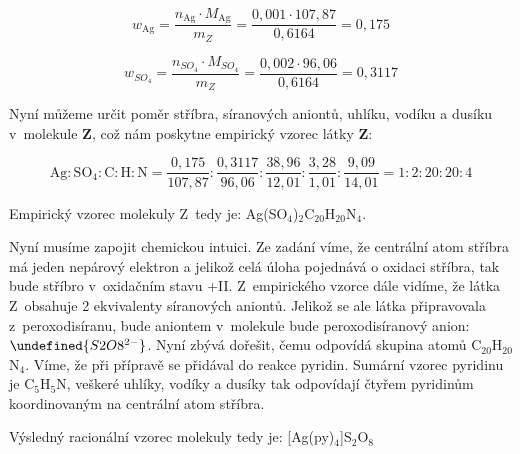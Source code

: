 \documentclass{book}
\let\ch\undefined
\begin{document}
\[
w_{\mathrm{Ag}}=\frac{n_{\mathrm{Ag}}\cdot M_{\mathrm{Ag}}}{m_{Z}}=\frac{0,001\cdot107,87}{0,6164}=0,175
\]

\[
w_{SO_{4}}=\frac{n_{SO_{4}}\cdot M_{SO_{4}}}{m_{Z}}=\frac{0,002\cdot96,06}{0,6164}=0,3117
\]

Nyní můžeme určit poměr stříbra, síranových aniontů, uhlíku, vodíku
a dusíku v~molekule \textbf{Z}, což nám poskytne empirický vzorec
látky \textbf{Z}:

\[
\mathrm{Ag:SO_{4}:C:H:N}=\frac{0,175}{107,87}:\frac{0,3117}{96,06}:\frac{38,96}{12,01}:\frac{3,28}{1,01}:\frac{9,09}{14,01}=1:2:20:20:4
\]

Empirický vzorec molekuly Z~tedy je: Ag(SO$_{4}$)$_{2}$C$_{20}$H$_{20}$N$_{4}$.

Nyní musíme zapojit chemickou intuici. Ze zadání víme, že centrální
atom stříbra má jeden nepárový elektron a jelikož celá úloha pojednává
o oxidaci stříbra, tak bude stříbro v~oxidačním stavu +II. Z~empirického
vzorce dále vidíme, že látka Z~obsahuje 2 ekvivalenty síranových aniontů.
Jelikož se ale látka připravovala z~peroxodisíranu, bude aniontem v~molekule bude  peroxodisíranový anion: $\ch{S2O8^{2-}}$.
Nyní zbývá dořešit, čemu odpovídá skupina atomů C$_{20}$H$_{20}$N$_{4}$.
Víme, že při přípravě se přidával do reakce pyridin. Sumární vzorec
pyridinu je C$_{5}$H$_{5}$N, veškeré uhlíky, vodíky a dusíky tak
odpovídají čtyřem pyridinům koordinovaným na centrální atom stříbra.

Výsledný racionální vzorec molekuly tedy je: {[}Ag(py)$_{4}${]}S$_{2}$O$_{8}$
\end{document}
